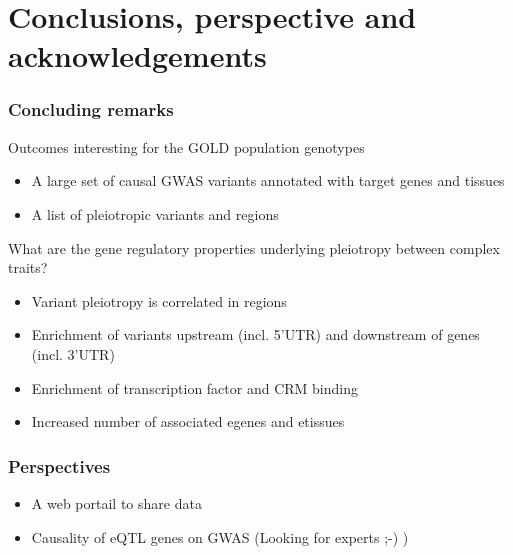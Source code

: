 \documentclass{beamer}
\begin{document}
    \section{Conclusions, perspective and acknowledgements} %

    \begin{frame}
        \frametitle{Concluding remarks}

        Outcomes interesting for the GOLD population genotypes
%
        \begin{itemize}
            \item A large set of causal GWAS variants annotated with target genes and tissues
            \item A list of pleiotropic variants and regions
        \end{itemize}
%
        \vfill
%
        What are the gene regulatory properties underlying pleiotropy between complex traits?
%
        \begin{itemize}
            \item Variant pleiotropy is correlated in regions
            \item Enrichment of variants upstream (incl. 5'UTR) and downstream of genes (incl. 3'UTR)
            \item Enrichment of transcription factor and CRM binding
            \item Increased number of associated egenes and etissues
        \end{itemize}


    \end{frame}

    \begin{frame}
        \frametitle{Perspectives}


        \begin{itemize}
            \item A web portail to share data
            \item Causality of eQTL genes on GWAS (Looking for experts ;-) )
        \end{itemize}

    \end{frame}
\end{document}
